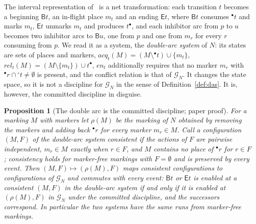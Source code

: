 \documentclass[preprint,12pt]{elsarticle}
\theoremstyle{plain}
\newtheorem{proposition}[theorem]{Proposition}
\theoremstyle{definition}
\newcommand{\en}{\mathit{en}}
\newcommand{\acq}{\mathit{acq}}
\newcommand{\rel}{\mathit{rel}}
\newcommand{\B}[1]{\mathsf{B}#1}
\newcommand{\E}[1]{\mathsf{E}#1}
\newcommand{\G}{\mathcal{G}}
\begin{document}
The interval representation of~\cite{AlqarniJanicki2015,AlqarniJanicki2018} is a net transformation: each transition $t$ becomes a beginning $\B{t}$, an in-flight place $m_t$ and an ending $\E{t}$, where $\B{t}$ consumes ${}^\bullet t$ and marks $m_t$, $\E{t}$ unmarks $m_t$ and produces $t^\bullet$, and each inhibitor arc from $p$ to $u$ becomes two inhibitor arcs to $\B{u}$, one from $p$ and one from $m_r$ for every $r$ consuming from $p$. We read it as a system, the \emph{double-arc system} of $N$: its states are sets of places and markers, $\acq_t(M) = (M \setminus {}^\bullet t) \cup \{m_t\}$, $\rel_t(M) = (M \setminus \{m_t\}) \cup t^\bullet$, $\en_t$ additionally requires that no marker $m_r$ with ${}^\bullet r \cap {}^\circ t \neq \emptyset$ is present, and the conflict relation is that of $\G_N$. It changes the state space, so it is not a discipline for $\G_N$ in the sense of Definition~\ref{def:das}. It is, however, the committed discipline in disguise.

\begin{proposition}[The double arc is the committed discipline; paper proof]
\label{prop:double}
For a marking $M$ with markers let $\rho(M)$ be the marking of $N$ obtained by removing the markers and adding back ${}^\bullet r$ for every marker $m_r \in M$. Call a configuration $(M, F)$ of the double-arc system \emph{consistent} if the actions of $F$ are pairwise independent, $m_r \in M$ exactly when $r \in F$, and $M$ contains no place of ${}^\bullet r$ for $r \in F$; consistency holds for marker-free markings with $F = \emptyset$ and is preserved by every event. Then $(M, F) \mapsto (\rho(M), F)$ maps consistent configurations to configurations of $\G_N$ and commutes with every event: $\B{t}$ or $\E{t}$ is enabled at a consistent $(M, F)$ in the double-arc system if and only if it is enabled at $(\rho(M), F)$ in $\G_N$ under the committed discipline, and the successors correspond. In particular the two systems have the same runs from marker-free markings.
\end{proposition}
\end{document}
